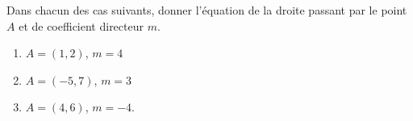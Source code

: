 
\begin{exercice}\label{exosmath-0354}

Dans chacun des cas suivants, donner l'équation de la droite passant par le point \( A\) et de coefficient directeur \( m\).
\begin{enumerate}
    \item
        \( A=(1,2)\), \( m=4\)
    \item
        \( A=(-5,7)\), \( m=3\)
    \item
        \( A=(4,6)\), \( m=-4\).
\end{enumerate}

\end{exercice}

